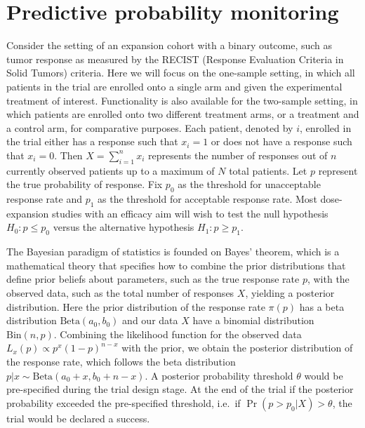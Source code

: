 \hypertarget{predictive-probability-monitoring}{%
\section{Predictive probability
monitoring}\label{predictive-probability-monitoring}}

Consider the setting of an expansion cohort with a binary outcome, such
as tumor response as measured by the RECIST (Response Evaluation
Criteria in Solid Tumors) criteria. Here we will focus on the one-sample
setting, in which all patients in the trial are enrolled onto a single
arm and given the experimental treatment of interest. Functionality is
also available for the two-sample setting, in which patients are
enrolled onto two different treatment arms, or a treatment and a control
arm, for comparative purposes. Each patient, denoted by \(i\), enrolled
in the trial either has a response such that \(x_i = 1\) or does not
have a response such that \(x_i = 0\). Then \(X = \sum_{i=1}^n x_i\)
represents the number of responses out of \(n\) currently observed
patients up to a maximum of \(N\) total patients. Let \(p\) represent
the true probability of response. Fix \(p_0\) as the threshold for
unacceptable response rate and \(p_1\) as the threshold for acceptable
response rate. Most dose-expansion studies with an efficacy aim will
wish to test the null hypothesis \(H_0: p \leq p_0\) versus the
alternative hypothesis \(H_1: p \geq p_1\).

The Bayesian paradigm of statistics is founded on Bayes' theorem, which
is a mathematical theory that specifies how to combine the prior
distributions that define prior beliefs about parameters, such as the
true response rate \(p\), with the observed data, such as the total
number of responses \(X\), yielding a posterior distribution. Here the
prior distribution of the response rate \(\pi(p)\) has a beta
distribution \(\mbox{Beta}(a_0, b_0)\) and our data \(X\) have a
binomial distribution \(\mbox{Bin}(n, p)\). Combining the likelihood
function for the observed data \(L_x(p) \propto p^x (1-p)^{n-x}\) with
the prior, we obtain the posterior distribution of the response rate,
which follows the beta distribution
\(p|x \sim \mbox{Beta}(a_0 + x, b_0 + n - x)\). A posterior probability
threshold \(\theta\) would be pre-specified during the trial design
stage. At the end of the trial if the posterior probability exceeded the
pre-specified threshold, i.e.~if \(\Pr(p>p_0 | X) > \theta\), the trial
would be declared a success.

